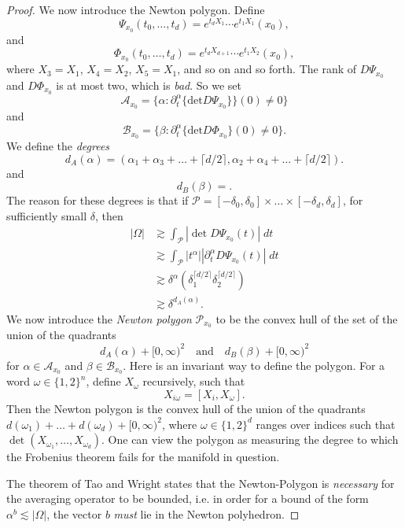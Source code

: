 \begin{proof}
    We now introduce the Newton polygon. Define
    \[ \Psi_{x_0}(t_0,\dots,t_d) = e^{t_d X_1} \cdots e^{t_1 X_1}(x_0), \]
    and
    \[ \Phi_{x_0}(t_0,\dots,t_d) = e^{t_d X_{d+1}} \cdots e^{t_1 X_2}(x_0), \]
    where $X_3 = X_1$, $X_4 = X_2$, $X_5 = X_1$, and so on and so forth. The rank of $D \Psi_{x_0}$ and $D \Phi_{x_0}$ is at most two, which is \emph{bad}. So we set
     \[ \mathcal{A}_{x_0} = \{ \alpha : \partial_t^\alpha \{ \text{det} D \Psi_{x_0} \} \} (0) \neq 0 \} \]
     and
     \[ \mathcal{B}_{x_0} = \{ \beta : \partial_t^\alpha \{ \text{det} D \Phi_{x_0} \} (0) \neq 0 \}.  \]
     We define the \emph{degrees}
     \[ d_A(\alpha) = (  \alpha_1 + \alpha_3 + \dots + \lceil d/2 \rceil, \alpha_2 + \alpha_4 + \dots + \lceil d/2 \rceil ). \]
     and
     \[ d_B(\beta) = . \]
     The reason for these degrees is that if $\mathcal{P} = [-\delta_0, \delta_0] \times \dots \times [-\delta_d, \delta_d]$, for sufficiently small $\delta$, then
     \begin{align*}
        |\Omega| &\gtrsim \int_{\mathcal{P}} | \det D \Psi_{x_0}(t) |\; dt\\
        &\gtrsim \int_{\mathcal{P}} |t^\alpha| | \partial_t^{\alpha} D \Psi_{x_0}(t) |\; dt\\
        & \gtrsim \delta^\alpha \left( \delta_1^{\lceil d/2 \rceil} \delta_2^{\lceil d/2 \rceil} \right)\\
        &\gtrsim \delta^{d_A(\alpha)}.
     \end{align*}
     We now introduce the \emph{Newton polygon} $\mathcal{P}_{x_0}$ to be the convex hull of the set of the union of the quadrants
     \[ d_A(\alpha) + [0,\infty)^2 \quad\text{and}\quad d_B(\beta) + [0,\infty)^2 \]
     for $\alpha \in \mathcal{A}_{x_0}$ and $\beta \in \mathcal{B}_{x_0}$. Here is an invariant way to define the polygon. For a word $\omega \in \{ 1, 2 \}^n$, define $X_\omega$ recursively, such that
     \[ X_{i \omega} = [X_i, X_\omega]. \]
     Then the Newton polygon is the convex hull of the union of the quadrants $d(\omega_1) + \dots + d(\omega_d) + [0,\infty)^2$, where $\omega \in \{ 1, 2 \}^d$ ranges over indices such that $\det ( X_{\omega_1}, \dots, X_{\omega_d} )$. One can view the polygon as measuring the degree to which the Frobenius theorem fails for the manifold in question.

     The theorem of Tao and Wright states that the Newton-Polygon is \emph{necessary} for the averaging operator to be bounded, i.e. in order for a bound of the form $\alpha^b \lesssim |\Omega|$, the vector $b$ \emph{must} lie in the Newton polyhedron.


\end{proof}


